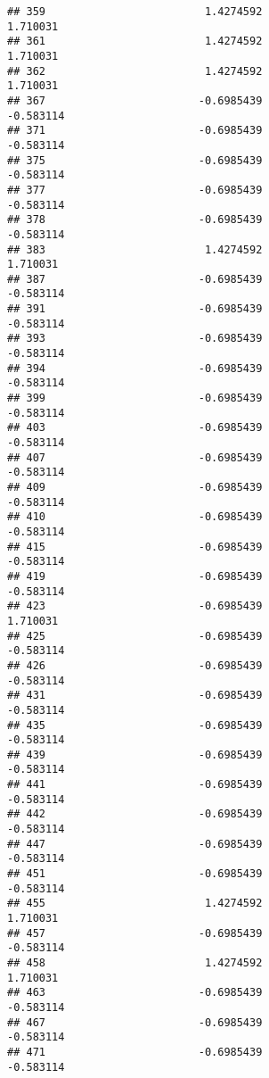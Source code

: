 \documentclass[
]{article}
\begin{document}
\begin{verbatim}
## 359                         1.4274592                         1.710031
## 361                         1.4274592                         1.710031
## 362                         1.4274592                         1.710031
## 367                        -0.6985439                        -0.583114
## 371                        -0.6985439                        -0.583114
## 375                        -0.6985439                        -0.583114
## 377                        -0.6985439                        -0.583114
## 378                        -0.6985439                        -0.583114
## 383                         1.4274592                         1.710031
## 387                        -0.6985439                        -0.583114
## 391                        -0.6985439                        -0.583114
## 393                        -0.6985439                        -0.583114
## 394                        -0.6985439                        -0.583114
## 399                        -0.6985439                        -0.583114
## 403                        -0.6985439                        -0.583114
## 407                        -0.6985439                        -0.583114
## 409                        -0.6985439                        -0.583114
## 410                        -0.6985439                        -0.583114
## 415                        -0.6985439                        -0.583114
## 419                        -0.6985439                        -0.583114
## 423                        -0.6985439                         1.710031
## 425                        -0.6985439                        -0.583114
## 426                        -0.6985439                        -0.583114
## 431                        -0.6985439                        -0.583114
## 435                        -0.6985439                        -0.583114
## 439                        -0.6985439                        -0.583114
## 441                        -0.6985439                        -0.583114
## 442                        -0.6985439                        -0.583114
## 447                        -0.6985439                        -0.583114
## 451                        -0.6985439                        -0.583114
## 455                         1.4274592                         1.710031
## 457                        -0.6985439                        -0.583114
## 458                         1.4274592                         1.710031
## 463                        -0.6985439                        -0.583114
## 467                        -0.6985439                        -0.583114
## 471                        -0.6985439                        -0.583114

\end{verbatim}
\end{document}
